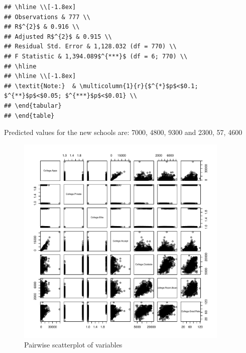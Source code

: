 \documentclass{article}\usepackage[]{graphicx}\usepackage[]{color}
\makeatletter
\newenvironment{kframe}{%
 \def\at@end@of@kframe{}%
 \ifinner\ifhmode%
  \def\at@end@of@kframe{\end{minipage}}%
  \begin{minipage}{\columnwidth}%
 \fi\fi%
 \def\FrameCommand##1{\hskip\@totalleftmargin \hskip-\fboxsep
 \colorbox{shadecolor}{##1}\hskip-\fboxsep
     \hskip-\linewidth \hskip-\@totalleftmargin \hskip\columnwidth}%
 \MakeFramed {\advance\hsize-\width
   \@totalleftmargin\z@ \linewidth\hsize
   \@setminipage}}%
 {\par\unskip\endMakeFramed%
 \at@end@of@kframe}
\newenvironment{knitrout}{}{} %
\makeatother
\begin{document}
\begin{knitrout}
\begin{kframe}
\begin{verbatim}
## \hline \\[-1.8ex] 
## Observations & 777 \\ 
## R$^{2}$ & 0.916 \\ 
## Adjusted R$^{2}$ & 0.915 \\ 
## Residual Std. Error & 1,128.032 (df = 770) \\ 
## F Statistic & 1,394.089$^{***}$ (df = 6; 770) \\ 
## \hline 
## \hline \\[-1.8ex] 
## \textit{Note:}  & \multicolumn{1}{r}{$^{*}$p$<$0.1; $^{**}$p$<$0.05; $^{***}$p$<$0.01} \\ 
## \end{tabular} 
## \end{table}
\end{verbatim}
\end{kframe}
\end{knitrout}

Predicted values for the new schools are: 7000, 4800, 9300 and 2300, 57, 4600 

\begin{figure}
\begin{center}
\begin{knitrout}
\color{fgcolor}
\includegraphics[width=4in]{figure/unnamed-chunk-2-1} 

\end{knitrout}
\caption{Pairwise scatterplot of variables}
\label{pairwise_scatterplot}
\end{center}
\end{figure}
\end{document}
